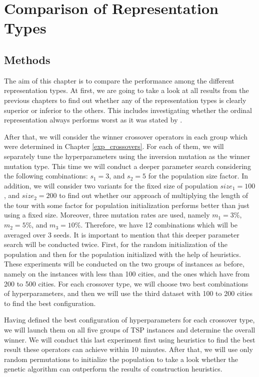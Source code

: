 \section{Comparison of Representation Types}
\label{exp_repr_types}

\subsection{Methods}
The aim of this chapter is to compare the performance among the different representation types. At first, we are going to take a look at all results  from the previous chapters to find out whether any of the representation types is clearly superior or inferior to the others. This includes investigating whether the ordinal representation always performs worst as it was stated by \citeauthor{potvin1996genetic} \cite{potvin1996genetic}.\par 

 After that, we will consider the winner crossover operators in each group which were determined in Chapter \ref{exp_crossovers}. For each of them, we will separately tune the hyperparameters using the inversion mutation as the winner mutation type. This time we will conduct a deeper parameter search considering the following combinations: $s_{1} = 3$, and $s_{2} = 5$ for the population size factor. In addition, we will consider two variants for the fixed size of population $size_{1} = 100$, and $size_{2} = 200$ to find out whether our approach of multiplying the length of the tour with some factor for population initialization performs better than just using a fixed size. Moreover, three mutation rates are used, namely $m_{1} = 3\%$, $m_{2} = 5\%$, and $m_{3} = 10\%$. Therefore, we have 12 combinations which will be averaged over 3 seeds. It is important to mention that this deeper parameter search will be conducted twice. First, for the random initialization of the population and then for the population initialized with the help of heuristics. These experiments will be conducted on the two groups of instances as before, namely on the instances with less than 100 cities, and the ones which have from 200 to 500 cities. For each crossover type, we will choose two best combinations of hyperparameters, and then we will use the third dataset with 100 to 200 cities to find the best configuration.\par 
 
 Having defined the best configuration of hyperparameters for each crossover type, we will launch them on all five groups of TSP instances and determine the overall winner. We will conduct this last experiment first using heuristics to find the best result these operators can achieve within 10 minutes. After that, we will use only random permutations to initialize the population to take a look whether the genetic algorithm can outperform the results of construction heuristics.\par

